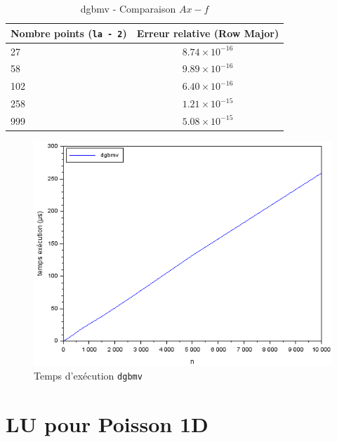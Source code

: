 \documentclass{article}
\begin{document}
 \begin{table}[H]
\caption{dgbmv - Comparaison $Ax - f$}
\centering
\renewcommand*\arraystretch{1.1}
\begin{tabular}{|l|c|}
  \hline
  Nombre points (\texttt{la - 2}) & Erreur relative (Row Major) \\
  \hline
	27	&	\(8.74 \times 10^{-16}\) \\
	58	&	\(9.89 \times 10^{-16}\) \\
	102	&	\(6.40 \times 10^{-16}\) \\
	258	&	\(1.21 \times 10^{-15}\) \\
	999	&	\(5.08 \times 10^{-15}\) \\
  \hline
\end{tabular}
\end{table}
\begin{figure}[H]
\caption{Temps d'exécution \texttt{dgbmv}}
\centering
\includegraphics[scale=0.70]{time_dgbmv}
\end{figure}


\section{LU pour Poisson 1D}
\end{document}
